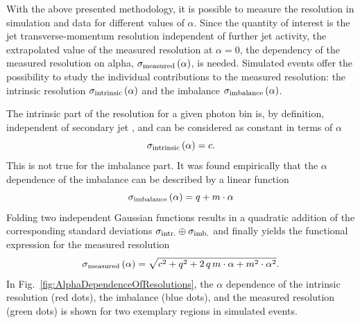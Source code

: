 With the above presented methodology, it is possible to measure the resolution in simulation and data for different values of $\alpha$.
Since the quantity of interest is the jet transverse-momentum resolution independent of further jet activity, \ie the extrapolated value of the measured resolution at $\alpha=0$, 
the dependency of the measured resolution on alpha, $\sigma_\mathrm{measured} \left( \alpha \right)$, is needed.
Simulated events offer the possibility to study the individual contributions to the measured resolution: the intrinsic resolution $\sigma_\mathrm{intrinsic}\left( \alpha \right)$ and the imbalance $\sigma_\mathrm{imbalance}\left( \alpha \right)$.%

The intrinsic part of the resolution for a given photon \pt bin is, by definition, independent of secondary jet \pt, and can be considered as constant in terms of $\alpha$
\begin{equation}\label{eq:intrinsic}
 \sigma_\mathrm{intrinsic} \left( \alpha\right) = c.
\end{equation}
This is not true for the imbalance part. 
It was found empirically that the $\alpha$ dependence of the imbalance can be described by a linear function~\cite{CMS:PAS:JETResolution_7TeV} 
\begin{equation}\label{eq:imbalance}
  \sigma_\mathrm{imbalance} \left( \alpha\right) = q + m \cdot \alpha
\end{equation}
Folding two independent Gaussian functions results in a quadratic addition of the corresponding standard deviations $\sigma_\mathrm{intr.}\oplus\sigma_\mathrm{imb.}$ and finally yields the functional expression for the measured resolution
\begin{equation}\label{eq:total}
  \sigma_\mathrm{measured} \left( \alpha \right) = \sqrt{ c^2 + q^2  + 2\, q\, m \cdot \alpha +m^2 \cdot \alpha^2}. 
\end{equation}
In Fig.~\ref{fig:AlphaDependenceOfResolutions}, the $\alpha$ dependence of the intrinsic resolution (red dots), the imbalance (blue dots), and the measured resolution (green dots) is shown for two exemplary \ptgamma regions in simulated events. 
